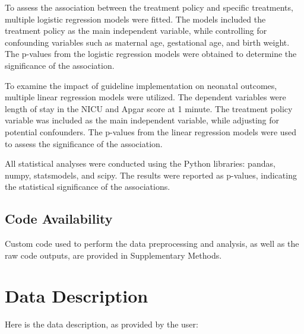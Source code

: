 \documentclass[11pt]{article}
\begin{document}
To assess the association between the treatment policy and specific treatments, multiple logistic regression models were fitted. The models included the treatment policy as the main independent variable, while controlling for confounding variables such as maternal age, gestational age, and birth weight. The p-values from the logistic regression models were obtained to determine the significance of the association.

To examine the impact of guideline implementation on neonatal outcomes, multiple linear regression models were utilized. The dependent variables were length of stay in the NICU and Apgar score at 1 minute. The treatment policy variable was included as the main independent variable, while adjusting for potential confounders. The p-values from the linear regression models were used to assess the significance of the association.

All statistical analyses were conducted using the Python libraries: pandas, numpy, statsmodels, and scipy. The results were reported as p-values, indicating the statistical significance of the associations.\subsection*{Code Availability}

Custom code used to perform the data preprocessing and analysis, as well as the raw code outputs, are provided in Supplementary Methods.


\clearpage
\appendix

\section{Data Description} \label{sec:data_description} Here is the data description, as provided by the user:
\end{document}
